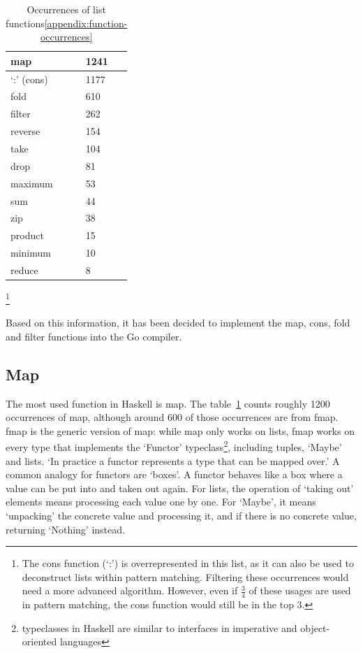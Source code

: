\begin{table}[htb]
\centering
\caption{Occurrences of list functions\ref{appendix:function-occurrences}}\label{tab:occurrences-list-funcs}
\begin{tabular}{ll}
\toprule
map & 1241 \\
\midrule
`:' (cons) & 1177 \\
\midrule
fold & 610 \\
\midrule
filter & 262 \\
\midrule
reverse & 154 \\
\midrule
take & 104 \\
\midrule
drop & 81 \\
\midrule
maximum & 53 \\
\midrule
sum & 44 \\
\midrule
zip & 38 \\
\midrule
product & 15 \\
\midrule
minimum & 10 \\
\midrule
reduce & 8
\end{tabular}
\end{table}
\footnote{The cons function (`:') is overrepresented in this list,
    as it can also be used to deconstruct lists within pattern matching. Filtering
    these occurrences would need a more advanced algorithm. However, even if $\tfrac{3}{4}$
    of these usages are used in pattern matching, the cons function would still be
    in the top 3.
}

Based on this information, it has been decided to implement the map, cons, fold
and filter functions into the Go compiler.

\subsection{Map}

The most used function in Haskell is map. The table~\ref{tab:occurrences-list-funcs}
counts roughly 1200 occurrences of map, although around 600 of those occurrences are from
fmap. fmap is the generic version of map: while map only works on lists, fmap
works on every type that implements the `Functor' typeclass\footnote{typeclasses
    in Haskell are similar to interfaces in imperative and object-oriented
languages}, including tuples, `Maybe' and lists.
`In practice a functor represents a type that can be mapped over.'\autocite{functor-wiki}
A common analogy for functors are `boxes'. A functor behaves like a box where
a value can be put into and taken out again. For lists, the operation of `taking out'
elements means processing each value one by one. For `Maybe', it means `unpacking' the
concrete value and processing it, and if there is no concrete value, returning `Nothing'
instead.

